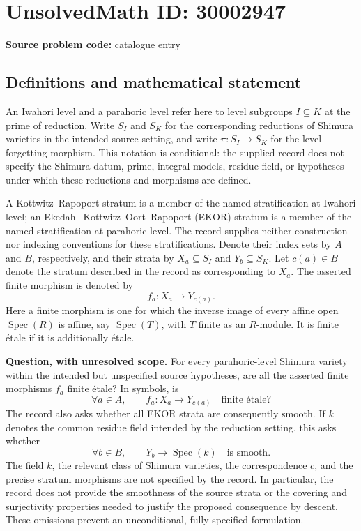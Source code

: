 \documentclass[11pt]{article}
\begin{document}
\section*{UnsolvedMath ID: 30002947}
\textbf{Source problem code:} catalogue entry
\subsection{Definitions and mathematical statement}
An Iwahori level and a parahoric level refer here to level subgroups \(I\subseteq K\) at the prime of reduction. Write \(S_I\) and \(S_K\) for the corresponding reductions of Shimura varieties in the intended source setting, and write \(\pi:S_I\to S_K\) for the level-forgetting morphism. This notation is conditional: the supplied record does not specify the Shimura datum, prime, integral models, residue field, or hypotheses under which these reductions and morphisms are defined.

A Kottwitz--Rapoport stratum is a member of the named stratification at Iwahori level; an Ekedahl--Kottwitz--Oort--Rapoport (EKOR) stratum is a member of the named stratification at parahoric level. The record supplies neither construction nor indexing conventions for these stratifications. Denote their index sets by \(A\) and \(B\), respectively, and their strata by \(X_a\subseteq S_I\) and \(Y_b\subseteq S_K\). Let \(c(a)\in B\) denote the stratum described in the record as corresponding to \(X_a\). The asserted finite morphism is denoted by
\[
 f_a:X_a\longrightarrow Y_{c(a)}.
\]
Here a finite morphism is one for which the inverse image of every affine open \(\operatorname{Spec}(R)\) is affine, say \(\operatorname{Spec}(T)\), with \(T\) finite as an \(R\)-module. It is finite \'{e}tale if it is additionally \'{e}tale.

\textbf{Question, with unresolved scope.} For every parahoric-level Shimura variety within the intended but unspecified source hypotheses, are all the asserted finite morphisms \(f_a\) finite \'{e}tale? In symbols, is
\[
 \forall a\in A,\qquad f_a:X_a\longrightarrow Y_{c(a)}
 \quad\text{finite \'{e}tale}?
\]
The record also asks whether all EKOR strata are consequently smooth. If \(k\) denotes the common residue field intended by the reduction setting, this asks whether
\[
 \forall b\in B,\qquad Y_b\longrightarrow\operatorname{Spec}(k)
 \quad\text{is smooth}.
\]
The field \(k\), the relevant class of Shimura varieties, the correspondence \(c\), and the precise stratum morphisms are not specified by the record. In particular, the record does not provide the smoothness of the source strata or the covering and surjectivity properties needed to justify the proposed consequence by descent. These omissions prevent an unconditional, fully specified formulation.
\end{document}
